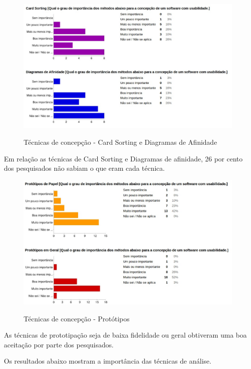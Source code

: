 	\begin{figure}[!h]
    	\centering
    	\includegraphics[keepaspectratio=true,scale=0.55]
      		{figuras/concepcao2.eps}
    	\label{check04}
		\caption{Técnicas de concepção - Card Sorting e Diagramas de Afinidade}
	\end{figure}

	Em relação as técnicas de Card Sorting e Diagramas de afinidade, 26 por cento dos pesquisados não sabiam o que eram cada técnica. 
		
	\begin{figure}[!h]
    	\centering
    	\includegraphics[keepaspectratio=true,scale=0.55]
      		{figuras/concepcao3.eps}
    	\label{check04}
		\caption{Técnicas de concepção - Protótipos}
	\end{figure}
	
	As técnicas de prototipação seja de baixa fidelidade ou geral obtiveram uma boa aceitação por parte dos pesquisados.

\newpage

	Os resultados abaixo mostram a importância das técnicas de análise.
	
